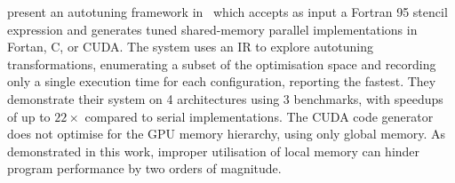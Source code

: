 \documentclass[preprint,nonatbib,10pt]{sigplanconf}
\begin{document}

\citeauthor{Kamil2010} present an autotuning framework
in~\cite{Kamil2010} which accepts as input a Fortran 95 stencil
expression and generates tuned shared-memory parallel implementations
in Fortan, C, or CUDA. The system uses an IR to explore autotuning
transformations, enumerating a subset of the optimisation space and
recording only a single execution time for each configuration,
reporting the fastest. They demonstrate their system on 4
architectures using 3 benchmarks, with speedups of up to $22\times$
compared to serial implementations. The CUDA code generator does not
optimise for the GPU memory hierarchy, using only global memory. As
demonstrated in this work, improper utilisation of local memory can
hinder program performance by two orders of magnitude.

\end{document}
